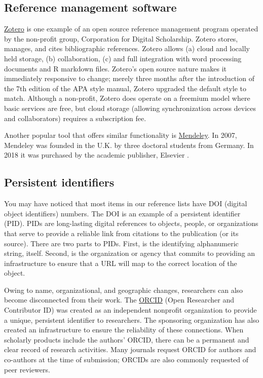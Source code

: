 \documentclass[
  11pt,
]{book}
\begin{document}
\subsection{Reference management software}\label{reference-management-software}

\href{https://www.zotero.org/}{Zotero} \citep{corporation_for_digital_scholarship_zotero_2022} is one example of an open source reference management program operated by the non-profit group, Corporation for Digital Scholarship. Zotero stores, manages, and cites bibliographic references. Zotero allows (a) cloud and locally held storage, (b) collaboration, (c) and full integration with word processing documents and R markdown files. Zotero's open source nature makes it immediately responsive to change; merely three months after the introduction of the 7th edition of the APA style manual, Zotero upgraded the default style to match. Although a non-profit, Zotero does operate on a freemium model where basic services are free, but cloud storage (allowing synchronization across devices and collaborators) requires a subscription fee.

Another popular tool that offers similar functionality is \href{www.mendeley.com}{Mendeley}. In 2007, Mendeley was founded in the U.K. by three doctoral students from Germany. In 2018 it was purchased by the academic publisher, Elsevier \citep{noauthor_mendeley_2022}.

\subsection{Persistent identifiers}\label{persistent-identifiers}

You may have noticed that most items in our reference lists have DOI (digital object identifiers) numbers. The DOI is an example of a persistent identifier (PID). PIDs are long-lasting digital references to objects, people, or organizations that serve to provide a reliable link from citations to the publication (or its source). There are two parts to PIDs. First, is the identifying alphanumeric string, itself. Second, is the organization or agency that commits to providing an infrastructure to ensure that a URL will map to the correct location of the object.

Owing to name, organizational, and geographic changes, researchers can also become disconnected from their work. The \href{https://info.orcid.org/}{ORCID} (Open Researcher and Contributor ID) was created as an independent nonprofit organization to provide a unique, persistent identifier to researchers. The sponsoring organization has also created an infrastructure to ensure the reliability of these connections. When scholarly products include the authors' ORCID, there can be a permanent and clear record of research activities. Many journals request ORCID for authors and co-authors at the time of submission; ORCIDs are also commonly requested of peer reviewers.
\end{document}

